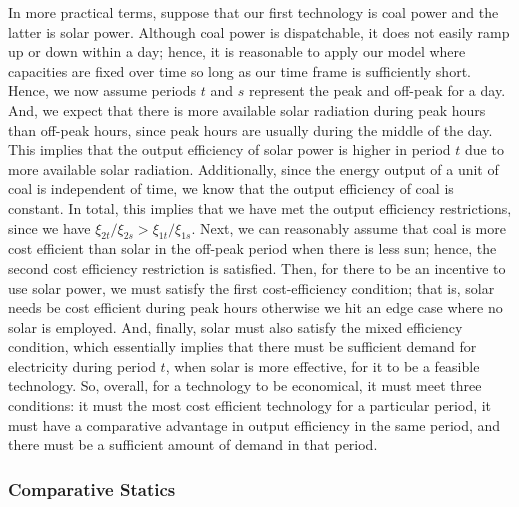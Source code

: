 \documentclass[11pt,a4paper,leqno]{extarticle}
\begin{document}
	
	
	In more practical terms, suppose that our first technology is coal power and the latter is solar power. Although coal power is dispatchable, it does not easily ramp up or down within a day; hence, it is reasonable to apply our model where capacities are fixed over time so long as our time frame is sufficiently short. Hence, we now assume periods $t$ and $s$ represent the peak and off-peak for a day. And, we expect that there is more available solar radiation during peak hours than off-peak hours, since peak hours are usually during the middle of the day. This implies that the output efficiency of solar power is higher in period $t$ due to more available solar radiation. Additionally, since the energy output of a unit of coal is independent of time, we know that the output efficiency of coal is constant. In total, this implies that we have met the output efficiency restrictions, since we have $\xi_{2t}/\xi_{2s} > \xi_{1t}/\xi_{1s}$. Next, we can reasonably assume that coal is more cost efficient than solar in the off-peak period when there is less sun; hence, the second cost efficiency restriction is satisfied. Then, for there to be an incentive to use solar power, we must satisfy the first cost-efficiency condition; that is, solar needs be cost efficient during peak hours otherwise we hit an edge case where no solar is employed. And, finally, solar must also satisfy the mixed efficiency condition, which essentially implies that there must be sufficient demand for electricity during period $t$, when solar is more effective, for it to be a feasible technology. So, overall, for a technology to be economical, it must meet three conditions: it must the most cost efficient technology for a particular period, it must have a comparative advantage in output efficiency in the same period, and there must be a sufficient amount of demand in that period. 
	
	
	
	\subsubsection{Comparative Statics}
	
\end{document}
